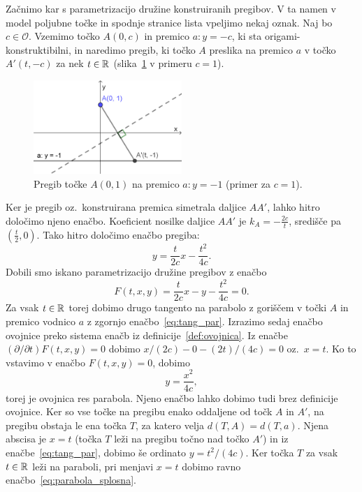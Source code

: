 Začnimo kar s parametrizacijo družine konstruiranih pregibov. V ta namen v model poljubne točke in spodnje stranice lista vpeljimo nekaj oznak. Naj bo $c \in \mathcal{O}$. Vzemimo točko $A(0, c)$ in premico $a: y = -c$, ki sta origami-konstruktibilni, in naredimo pregib, ki točko $A$ preslika na premico $a$ v točko $A'(t, -c)$ za nek $t \in \mathbb R$ (slika~\ref{fig:enacba_tangente_par1} v primeru $c = 1$).

\begin{figure}[h]
    \centering
    \includegraphics[width=0.5\textwidth]{images/enacba_parabole1.png}
    \caption[Enačba tangente na parabolo]{Pregib točke $A(0, 1)$ na premico $a: y = -1$ (primer za $c = 1$).}
    \label{fig:enacba_tangente_par1}
\end{figure}

Ker je pregib oz.\ konstruirana premica simetrala daljice $AA'$, lahko hitro določimo njeno enačbo. Koeficient nosilke daljice $AA'$ je $k_A = -\frac{2c}{t}$, središče pa $(\frac{t}{2}, 0)$. Tako hitro določimo enačbo pregiba:
\begin{equation}
    y = \frac{t}{2c} x - \frac{t^2}{4c}.
    \label{eq:tang_par}
\end{equation}
Dobili smo iskano parametrizacijo družine pregibov z enačbo
$$F(t, x, y) = \frac{t}{2c} x - y - \frac{t^2}{4c} = 0. $$
Za vsak $t \in \mathbb R$ torej dobimo drugo tangento na parabolo z goriščem v točki $A$ in premico vodnico $a$ z zgornjo enačbo~\ref{eq:tang_par}. Izrazimo sedaj enačbo ovojnice preko sistema enačb iz definicije~\ref{def:ovojnica}. Iz enačbe $(\partial / \partial t) F(t, x, y) = 0$ dobimo $x/(2c) - 0 - (2t)/(4c) = 0$ oz.\ $x = t$. Ko to vstavimo v enačbo $F(t, x, y) = 0$, dobimo
\begin{equation}
    \label{eq:parabola_splosna}
    y = \frac{x^2}{4c},
\end{equation}
torej je ovojnica res parabola. Njeno enačbo lahko dobimo tudi brez definicije ovojnice. Ker so vse točke na pregibu enako oddaljene od točk $A$ in $A'$, na pregibu obstaja le ena točka $T$, za katero velja $d(T, A) = d(T, a)$. Njena abscisa je $x = t$ (točka $T$ leži na pregibu točno nad točko $A'$) in iz enačbe~\ref{eq:tang_par}, dobimo še ordinato $y = t^2/(4c)$. Ker točka $T$ za vsak $t \in \mathbb R$ leži na paraboli, pri menjavi $x = t$ dobimo ravno enačbo~\ref{eq:parabola_splosna}.


